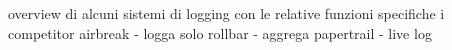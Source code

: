 overview di alcuni sistemi di logging con le relative funzioni specifiche
i competitor
airbreak - logga solo
rollbar - aggrega
papertrail - live log
